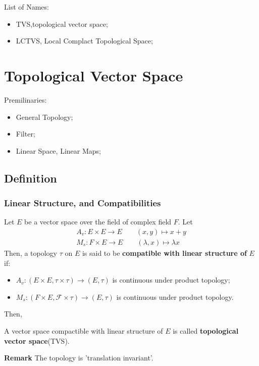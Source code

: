 \documentclass[Total.tex]{subfiles}
\begin{document}
	List of Names:
	\begin{itemize}
		\item TVS,topological vector space;
		\item LCTVS, Local Complact Topological Space;
	\end{itemize}
	\chapter{Topological Vector Space}
		Premilinaries:
		\begin{itemize}
			\item General Topology;
			\item Filter;
			\item Linear Space, Linear Maps;
		\end{itemize}
		\section{Definition}
			\subsection{Linear Structure, and Compatibilities}
				\begin{Def}
					Let $E$ be a vector space over the field of complex field $F$. Let 
					\begin{gather*}
						A_v:E\times E\rightarrow E\qquad (x,y)\mapsto x+y\\
						M_s:F\times E\rightarrow E\qquad (\lambda,x)\mapsto \lambda x
					\end{gather*}
					Then, a topology $\tau$ on $E$ is said to be \textbf{compatible with linear structure of }$E$ if:
					\begin{itemize}
						\item $A_v:(E\times E,\tau\times \tau)\rightarrow (E,\tau)$ is continuous under product topology;
						\item $M_s:(F\times E,\mathcal{F}\times \tau)\rightarrow (E,\tau)$ is continuous under product topology. 
					\end{itemize}
				\end{Def}
				Then,
				\begin{Def}
					A vector space compactible with linear structure of $E$ is called \textbf{topological vector space}(TVS).
				\end{Def}
				\textbf{Remark} The topology is 'translation invariant'. 
\end{document}

